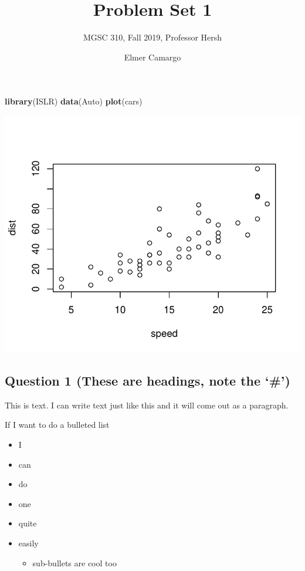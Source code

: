 \documentclass[]{article}
\title{Problem Set 1}
\subtitle{MGSC 310, Fall 2019, Professor Hersh}
\author{Elmer Camargo}
\date{}
\newenvironment{Shaded}{\begin{snugshade}}{\end{snugshade}}
\newcommand{\KeywordTok}[1]{\textcolor[rgb]{0.13,0.29,0.53}{\textbf{#1}}}
\newcommand{\NormalTok}[1]{#1}
\providecommand{\tightlist}{%
  \setlength{\itemsep}{0pt}\setlength{\parskip}{0pt}}
\begin{document}
\maketitle

\begin{Shaded}
\begin{Highlighting}[]
\KeywordTok{library}\NormalTok{(ISLR)}
\KeywordTok{data}\NormalTok{(Auto)}
\KeywordTok{plot}\NormalTok{(cars)}
\end{Highlighting}
\end{Shaded}

\begin{center}\includegraphics{RMarkdown_Pset_Template_files/figure-latex/unnamed-chunk-1-1} \end{center}

\hypertarget{question-1-these-are-headings-note-the}{%
\subsection{Question 1 (These are headings, note the
`\#')}\label{question-1-these-are-headings-note-the}}

This is text. I can write text just like this and it will come out as a
paragraph.

If I want to do a bulleted list

\begin{itemize}
\tightlist
\item
  I
\item
  can
\item
  do
\item
  one
\item
  quite
\item
  easily

  \begin{itemize}
  \tightlist
  \item
    sub-bullets are cool too
  \end{itemize}
\end{itemize}
\end{document}
